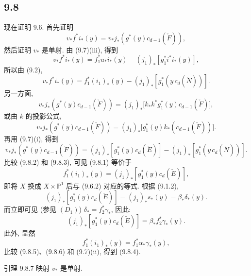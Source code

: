 \subsection*{9.8}

现在证明 9.6. 首先证明
\[
v_*f^*i_*(y)=v_*j_*(g^*(y)c_{d-1}(\check F)),
\tag{9.8.1}
\]
然后证明 $v_*$ 是单射. 由 (9.7)(iii), 得到
\[
v_*f^*i_*(y)=f_1^*u_*i_*(y)-(j_1)_*[g_1^*i^*i_*(y)],
\]
所以由 (9.2),
\[
v_*f^*i_*(y)=f_1^*(i_1)_*(y)-(j_1)_*[g_1^*(y\,c_d(\check N))].
\tag{9.8.2}
\]
另一方面,
\[
v_*j_*(g^*(y)c_{d-1}(\check F))
=(j_1)_*\bigl[k_*k^*g_1^*(y)c_{d-1}(\check F)\bigr],
\]
或由 $k$ 的投影公式,
\[
v_*j_*(g^*(y)c_{d-1}(\check F))
=(j_1)_*\bigl[g_1^*(y)k_*(c_{d-1}(\check F))\bigr].
\]
再用 (9.7)(i), 得到
\[
v_*j_*(g^*(y)c_{d-1}(\check F))
=(j_1)_*[g_1^*(y)c_d(\check E)]-(j_1)_*[g_1^*(y\,c_d(\check N))].
\tag{9.8.3}
\]
比较 (9.8.2) 和 (9.8.3), 可见 (9.8.1) 等价于
\[
f_1^*(i_1)_*(y)=(j_1)_*[g_1^*(y)c_d(\check E)],
\tag{9.8.4}
\]
即将 $X$ 换成 $X\times\mathbb P^1$ 后与 (9.6.2) 对应的等式. 根据 (9.1.2),
\[
(j_1)_*[g_1^*(y)c_d(\check E)]=(j_1)_*s_*(y)=\beta_*\delta_*(y).
\]
而立即可见 (参见 $(D_1)$) $\delta_*=f_2^*\gamma_*$, 因此:
\[
(j_1)_*[g_1^*(y)c_d(\check E)]=\beta_*f_2^*\gamma_*(y).
\tag{9.8.5}
\]
此外, 显然
\[
f_1^*(i_1)_*(y)=f_1^*\alpha_*\gamma_*(y),
\tag{9.8.6}
\]
比较 (9.8.5)、(9.8.6) 和 (9.7)(ii), 得到 (9.8.4).

\begin{statement}{引理 9.8.7}
映射 $v_*$ 是单射.
\end{statement}

